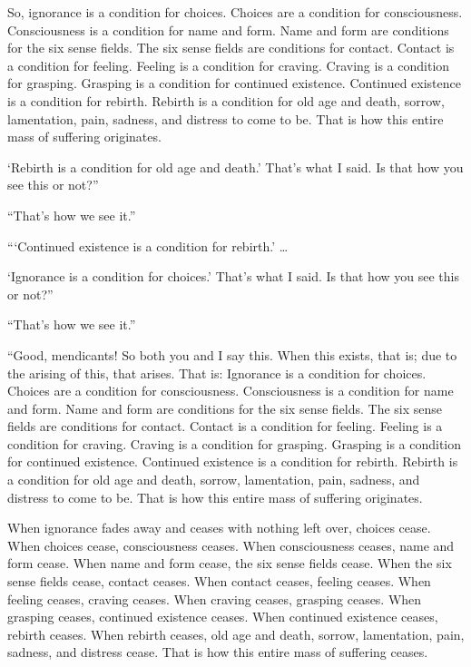 \documentclass[12pt,openany]{book}%
\begin{document}
So, ignorance is a condition for choices. Choices are a condition for consciousness. Consciousness is a condition for name and form. Name and form are conditions for the six sense fields. The six sense fields are conditions for contact. Contact is a condition for feeling. Feeling is a condition for craving. Craving is a condition for grasping. Grasping is a condition for continued existence. Continued existence is a condition for rebirth. Rebirth is a condition for old age and death, sorrow, lamentation, pain, sadness, and distress to come to be. That is how this entire mass of suffering originates. 

‘Rebirth is a condition for old age and death.’ That’s what I said. Is that how you see this or not?” 

“That’s how we see it.” 

“‘Continued existence is a condition for rebirth.’ … 

‘Ignorance is a condition for choices.’ That’s what I said. Is that how you see this or not?” 

“That’s how we see it.” 

“Good, mendicants! So both you and I say this. When this exists, that is; due to the arising of this, that arises. That is: Ignorance is a condition for choices. Choices are a condition for consciousness. Consciousness is a condition for name and form. Name and form are conditions for the six sense fields. The six sense fields are conditions for contact. Contact is a condition for feeling. Feeling is a condition for craving. Craving is a condition for grasping. Grasping is a condition for continued existence. Continued existence is a condition for rebirth. Rebirth is a condition for old age and death, sorrow, lamentation, pain, sadness, and distress to come to be. That is how this entire mass of suffering originates. 

When ignorance fades away and ceases with nothing left over, choices cease. When choices cease, consciousness ceases. When consciousness ceases, name and form cease. When name and form cease, the six sense fields cease. When the six sense fields cease, contact ceases. When contact ceases, feeling ceases. When feeling ceases, craving ceases. When craving ceases, grasping ceases. When grasping ceases, continued existence ceases. When continued existence ceases, rebirth ceases. When rebirth ceases, old age and death, sorrow, lamentation, pain, sadness, and distress cease. That is how this entire mass of suffering ceases. 
\end{document}

